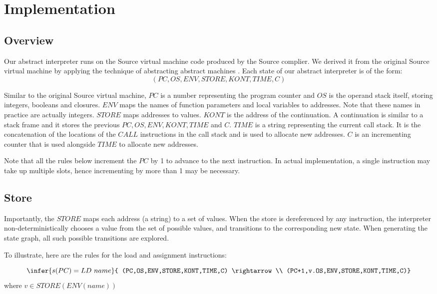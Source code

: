 \documentclass[12pt]{article}
\begin{document}
\section{Implementation}
\subsection{Overview}
Our abstract interpreter runs on the Source virtual machine code produced by the Source complier. We derived it from the original Source virtual machine by applying the technique of abstracting abstract machines \cite{aam}. Each state of our abstract interpreter is of the form:
$$(PC,OS,ENV,STORE,KONT,TIME,C)$$

Similar to the original Source virtual machine, $PC$ is a number representing the program counter and $OS$ is the operand stack itself, storing integers, booleans and closures. $ENV$ maps the names of function parameters and local variables to addresses. Note that these names in practice are actually integers. $STORE$ maps addresses to values. $KONT$ is the address of the continuation. A continuation is similar to a stack frame and it stores the previous $PC,OS,ENV,KONT,TIME$ and $C$. $TIME$ is a string representing the current call stack. It is the concatenation of the locations of the $CALL$ instructions in the call stack and is used to allocate new addresses. $C$ is an incrementing counter that is used alongside $TIME$ to allocate new addresses.

Note that all the rules below increment the $PC$ by 1 to advance to the next instruction. In actual implementation, a single instruction may take up multiple slots, hence incrementing by more than 1 may be necessary.

\subsection{Store}
Importantly, the $STORE$ maps each address (a string) to a set of values. When the store is dereferenced by any instruction, the interpreter non-deterministically chooses a value from the set of possible values, and transitions to the corresponding new state. When generating the state graph, all such possible transitions are explored.

To illustrate, here are the rules for the load and assignment instructions:

$$\infer{s(PC) = LD\ name}{
    (PC,OS,ENV,STORE,KONT,TIME,C) \rightarrow \\
    (PC+1,v.OS,ENV,STORE,KONT,TIME,C)}$$
where $v \in STORE(ENV(name))$
\end{document}
